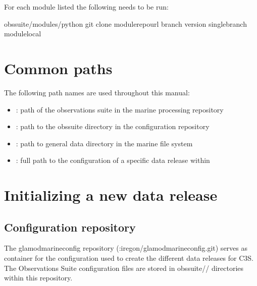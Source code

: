 \documentclass[letterpaper,10pt,english]{sphinxmanual}
\begin{document}
For each module listed the following needs to be run:

\begin{sphinxVerbatim}[commandchars=\\\{\}]
 obs\PYGZhy{}suite/modules/python
git clone module\PYGZus{}repo\PYGZus{}url \PYGZhy{}\PYGZhy{}branch version \PYGZhy{}\PYGZhy{}single\PYGZhy{}branch module\PYGZus{}local
\end{sphinxVerbatim}


\chapter{Common paths}
\label{\detokenize{index:common-paths}}
The following path names are used throughout this manual:
\begin{itemize}
\item {}
: path of the observations suite in the marine processing repository

\item {}
: path to the obs\sphinxhyphen{}suite directory in the configuration repository

\item {}
: path to general data directory in the marine file system

\item {}
: full path to the configuration of a specific data release
within 

\end{itemize}


\chapter{Initializing a new data release}
\label{\detokenize{index:initializing-a-new-data-release}}

\section{Configuration repository}
\label{\detokenize{index:configuration-repository}}
The glamod\sphinxhyphen{}marine\sphinxhyphen{}config repository
(:iregon/glamod\sphinxhyphen{}marine\sphinxhyphen{}config.git) serves as container for the
configuration used to create the different data releases for C3S. The
Observations Suite configuration files are stored in
obs\sphinxhyphen{}suite/\sphinxhyphen{}/ directories within this repository.
\end{document}
